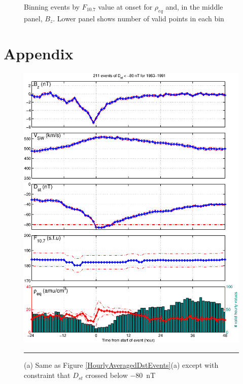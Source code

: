 \documentclass[10pt,twocolumn]{article}
\begin{document}
\begin{figure}[tp!]
\caption{Binning events by $F_{10.7}$ value at onset for $\rho_{eq}$ and, in the middle panel, $B_z$. Lower panel shows number of valid points in each bin}
\label{f107bin}
\end{figure}

\clearpage

\section{Appendix}
\hfill

\begin{figure}[htp!]
\centering
\includegraphics[scale=0.40]{paperfigures/stormavs-d80.eps}
\rule[1ex]{5cm}{1pt}
\caption{(a) Same as Figure \ref{HourlyAveragedDstEvents}(a) except with constraint that $D_{st}$ crossed below $-80$~nT }
\label{Dspec}
\end{figure}

\clearpage
\end{document}
